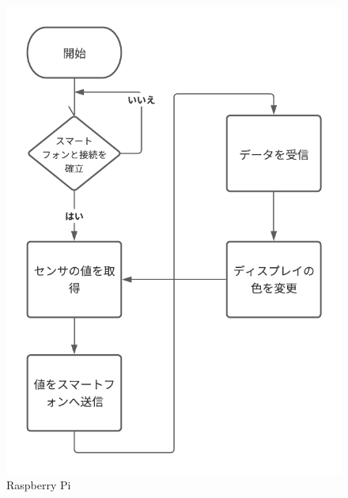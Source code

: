 \documentclass[dvipdfmx,autodetect-engine,titlepage]{jsarticle}
\begin{document}
  \begin{figure}[h]
    \centering
    \begin{minipage}[b]{0.45\linewidth}
    \begin{center}
      \includegraphics[keepaspectratio,scale=0.5]{フローチャート1.png}
      \end{center}
      \caption{Raspberry Pi}
    \end{minipage}
    \begin{minipage}[b]{0.45\linewidth}
    \begin{center}

\end{center}
\end{minipage}
\end{figure}
\end{document}
